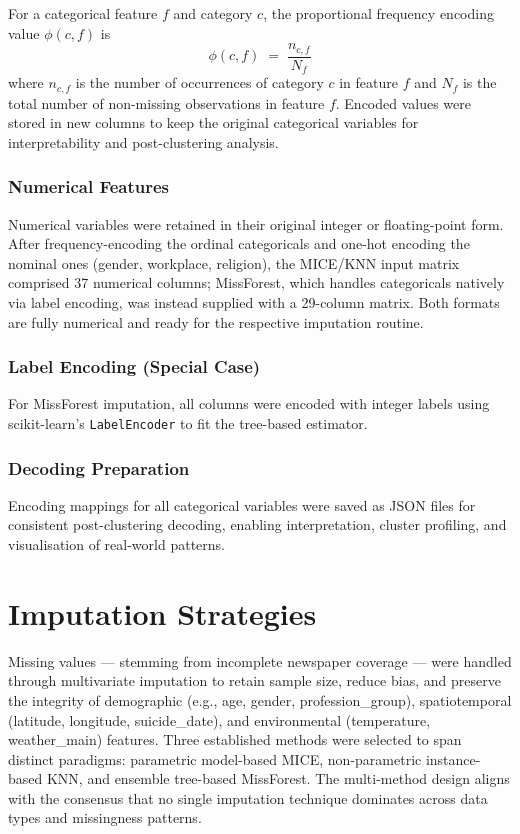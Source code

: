 For a categorical feature $f$ and category $c$, the proportional frequency encoding value $\phi(c, f)$ is
\begin{equation}\label{eq:frequency_encoding}
\phi(c, f) \;=\; \frac{n_{c, f}}{N_f}
\end{equation}
where $n_{c, f}$ is the number of occurrences of category $c$ in feature $f$ and $N_f$ is the total number of non-missing observations in feature $f$. Encoded values were stored in new columns to keep the original categorical variables for interpretability and post-clustering analysis.

\subsubsection{Numerical Features}

Numerical variables were retained in their original integer or floating-point form. After frequency-encoding the ordinal categoricals and one-hot encoding the nominal ones (gender, workplace, religion), the MICE/KNN input matrix comprised 37 numerical columns; MissForest, which handles categoricals natively via label encoding, was instead supplied with a 29-column matrix. Both formats are fully numerical and ready for the respective imputation routine.

\subsubsection{Label Encoding (Special Case)}

For MissForest imputation, all columns were encoded with integer labels using scikit-learn's \texttt{LabelEncoder} to fit the tree-based estimator.

\subsubsection{Decoding Preparation}

Encoding mappings for all categorical variables were saved as JSON files for consistent post-clustering decoding, enabling interpretation, cluster profiling, and visualisation of real-world patterns.

\section{Imputation Strategies}

Missing values --- stemming from incomplete newspaper coverage --- were handled through multivariate imputation to retain sample size, reduce bias, and preserve the integrity of demographic (e.g., age, gender, profession\_group), spatiotemporal (latitude, longitude, suicide\_date), and environmental (temperature, weather\_main) features. Three established methods were selected to span distinct paradigms: parametric model-based MICE, non-parametric instance-based KNN, and ensemble tree-based MissForest. The multi-method design aligns with the consensus that no single imputation technique dominates across data types and missingness patterns.

